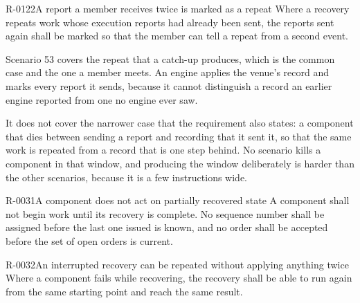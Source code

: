 \begin{requirement}{R-0122}{A report a member receives twice is marked as a repeat}
  Where a recovery repeats work whose execution reports had already been sent,
  the reports sent again shall be marked so that the member can tell a repeat
  from a second event.
\end{requirement}

\begin{gap}{}
  Scenario 53 covers the repeat that a catch-up produces, which is the common case
  and the one a member meets. An engine applies the venue's record and marks every
  report it sends, because it cannot distinguish a record an earlier engine
  reported from one no engine ever saw.

  It does not cover the narrower case that the requirement also states: a component
  that dies between sending a report and recording that it sent it, so that the
  same work is repeated from a record that is one step behind. No scenario kills a
  component in that window, and producing the window deliberately is harder than
  the other scenarios, because it is a few instructions wide.
\end{gap}

\begin{requirement}{R-0031}{A component does not act on partially recovered state}
  A component shall not begin work until its recovery is complete. No sequence
  number shall be assigned before the last one issued is known, and no order
  shall be accepted before the set of open orders is current.
\end{requirement}

\begin{requirement}{R-0032}{An interrupted recovery can be repeated without applying anything twice}
  Where a component fails while recovering, the recovery shall be able to run
  again from the same starting point and reach the same result.
\end{requirement}
